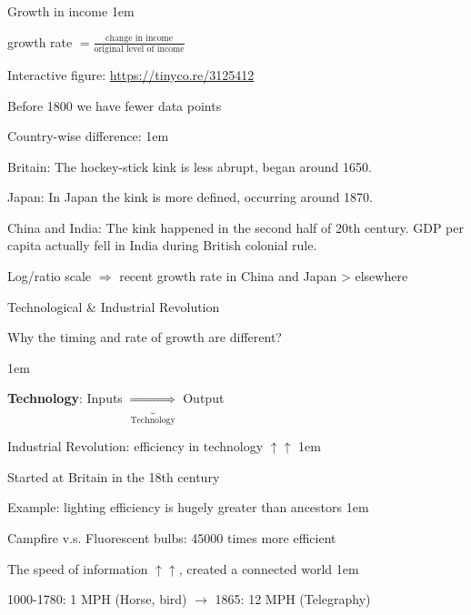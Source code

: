 \documentclass[11pt,aspectratio=43,usenames,dvipsnames]{beamer}
\newcommand{\blue}[1]{\textcolor{blue}{#1}}
\let\olditemize=\itemize
\let\endolditemize=\enditemize
\renewenvironment{itemize}{\olditemize \itemsep1em}{\endolditemize}
\let\oldenumerate=\enumerate
\let\endoldenumerate=\endenumerate
\renewenvironment{enumerate}{\oldenumerate \itemsep1em}{ \endoldenumerate}
\theoremstyle{definition}
\begin{document}
\begin{frame}{Growth in income}
\label{slide:Growth_in_income}
    \begin{itemize}
        \item growth rate $ = \frac{\text{change in income}}{\text{original level of income}}$
        \item Interactive figure: \blue{\url{https://tinyco.re/3125412}}
        \item Before 1800 we have fewer data points
        \item Country-wise difference:
        \begin{enumerate}
            \item Britain: The hockey-stick kink is less abrupt, began around 1650.
            \item Japan: In Japan the kink is more defined, occurring around 1870.
            \item China and India: The kink happened in the second half of 20th century. GDP per capita actually fell in India during British colonial rule.
        \end{enumerate}
        \item Log/ratio scale $ \Rightarrow  $ recent growth rate in China and Japan > elsewhere
    \end{itemize}
\end{frame}

\begin{frame}{Technological \& Industrial Revolution}
\label{slide:Technological____Industrial_Revolution}
    \begin{center}
        Why the timing and rate of growth are different?
    \end{center}
    \begin{itemize}
        \item \textbf{Technology}: Inputs $ \underbrace{\Longrightarrow}_{\text{Technology}}  $ Output
        \item Industrial Revolution: efficiency in technology $ \uparrow \uparrow  $
        \begin{itemize}
            \item Started at Britain in the 18th century
            \item Example: lighting efficiency is hugely greater than ancestors
            \begin{itemize}
                \item Campfire v.s. Fluorescent bulbs: 45000 times more efficient
            \end{itemize}
        \end{itemize}
        \item The speed of information $ \uparrow \uparrow  $, created a connected world
        \begin{itemize}
            \item 1000-1780: 1 MPH (Horse, bird) $ \rightarrow  $ 1865: 12 MPH (Telegraphy)
        \end{itemize}
    \end{itemize}
\end{frame}
\end{document}
